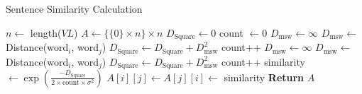\begin{algorithm} \caption{Sentence Similarity Calculation} \label{alg:similarity}
\begin{algorithmic}[1]
    \State $n \gets$ length($VL$)
    \State $A \gets \{ \{0\} \times n \} \times n$
        \State $D_{\text{Square}} \gets 0$
        \State count $\gets 0$
                \State $D_{\text{msw}} \gets \infty$
                        \State $D_{\text{msw}} \gets$ Distance(word$_i$, word$_j$)
                    \EndIf
                \EndFor
                \State $D_{\text{Square}} \gets D_{\text{Square}} + D_{\text{msw}}^2$
                \State count++
            \EndFor
                \State $D_{\text{msw}} \gets \infty$
                        \State $D_{\text{msw}} \gets$ Distance(word$_i$, word$_j$)
                    \EndIf
                \EndFor
                \State $D_{\text{Square}} \gets D_{\text{Square}} + D_{\text{msw}}^2$
                \State count++
            \EndFor
            \State similarity $\gets \exp \left( \frac{- D_{\text{Square}}}{2 \times \text{count} \times \sigma^2} \right)$
            \State $A[i][j] \gets A[j][i] \gets$ similarity
        \EndFor
    \EndFor
    \State \textbf{Return} $A$
\end{algorithmic}
\end{algorithm}
%

